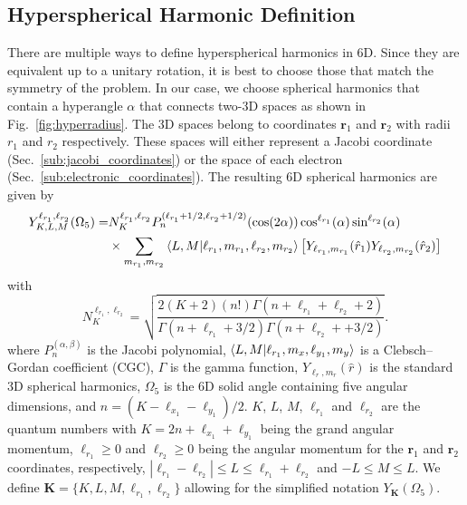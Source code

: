 \subsection{Hyperspherical Harmonic Definition} %
\label{sub:spherical_harmonics}
There are multiple ways to define hyperspherical harmonics in 6D. Since they are equivalent up to a unitary rotation, it is best to choose those that match the symmetry of the problem. In our case, we choose spherical harmonics that contain a hyperangle $\alpha$ that connects two-3D spaces as shown in Fig.~\ref{fig:hyperradius}. The 3D spaces belong to coordinates $\mathbf{r}_1$ and $\mathbf{r}_2$ with radii $r_1$ and $r_2$ respectively. These spaces will either represent a Jacobi coordinate (Sec.~\ref{sub:jacobi_coordinates}) or the space of each electron (Sec.~\ref{sub:electronic_coordinates}). The resulting 6D spherical harmonics are given by
\begin{align}
    Y^{\ell_{r_1},\ell_{r_2}}_{K,L,M}(\Omega_{5}) =& N^{\ell_{r_1},\ell_{r_2}}_K P_n^{(\ell_{r_1}+1/2,\ell_{r_2}+1/2)}(\cos(2\alpha)) \cos^{\ell_{r_1}}(\alpha) \sin^{\ell_{r_2}}(\alpha) \\ 
    &\times\sum_{m_{r_1},m_{r_2}}\bra{L,M}\ket{\ell_{r_1},m_{r_1},\ell_{r_2},m_{r_2}}  \left[Y_{\ell_{r_1},m_{r_1}}(\hat{r}_1) Y_{\ell_{r_2},m_{r_2}}(\hat{r}_2)\right]
\end{align}
with
\begin{equation}
    N^{\ell_{r_1},\ell_{r_2}}_K = \sqrt{\frac{2(K+2)(n!)\Gamma (n+\ell_{r_1}+\ell_{r_2}+2)}{\Gamma (n+\ell_{r_1}+3/2) \Gamma (n+\ell_{r_2}++3/2)}}.
\end{equation}
where $P_n^{(\alpha,\beta)}$ is the Jacobi polynomial,  $\bra{L,M}\ket{\ell_{r_1},m_x,\ell_{y_1},m_y}$ is a Clebsch–Gordan coefficient (CGC), $\Gamma$ is the gamma function, $Y_{\ell_{r},m_{r}}(\hat{r})$ is the standard 3D spherical harmonics, $\Omega_5$ is the 6D solid angle containing five angular dimensions, and $n = (K-\ell_{x_1}-\ell_{y_1})/2$. $K$, $L$, $M$, $\ell_{r_1}$ and $\ell_{r_2}$ are the quantum numbers with $K=2n+\ell_{x_1}+\ell_{y_1}$ being the grand angular momentum, $\ell_{r_1}\ge0$ and $\ell_{r_2}\ge0$ being the angular momentum for the $\mathbf{r}_1$ and $\mathbf{r}_2$ coordinates, respectively, $|\ell_{r_1}-\ell_{r_2}|\le L \le \ell_{r_1}+\ell_{r_2}$ and $-L \le M \le L$. We define $\mathbf{K}=\{K, L, M, \ell_{r_1}, \ell_{r_2}\}$ allowing for the simplified notation $Y_{\mathbf{K}}(\Omega_{5})$.

